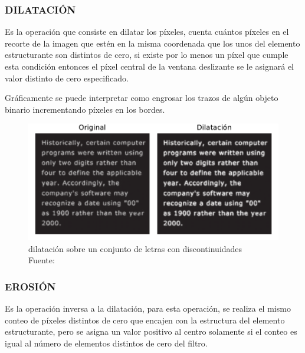 			\subsubsection{DILATACIÓN}
				Es la operación que consiste en dilatar los píxeles, cuenta cuántos píxeles en el recorte de la imagen que estén en la misma coordenada que los unos del elemento estructurante son distintos de cero, si existe por lo menos un píxel que cumple esta condición entonces el píxel central de la ventana deslizante se le asignará el valor distinto de cero especificado.
				
				Gráficamente se puede interpretar como engrosar los trazos de algún objeto binario incrementando píxeles en los bordes.
				
				\begin{figure}[H]
					\centering
					\includegraphics[scale=0.7]{imagenes/dilatacion}
					\caption[Dilatación sobre un conjunto de letras con discontinuidades]{dilatación sobre un conjunto de letras con discontinuidades\\Fuente: \citep{gonzalez}}
				\end{figure}	
						
			\subsubsection{EROSIÓN}
				Es la operación inversa a la dilatación, para esta operación, se realiza el mismo conteo de píxeles distintos de cero que encajen con la estructura del elemento estructurante, pero se asigna un valor positivo al centro solamente si el conteo es igual al número de elementos distintos de cero del filtro.
				
